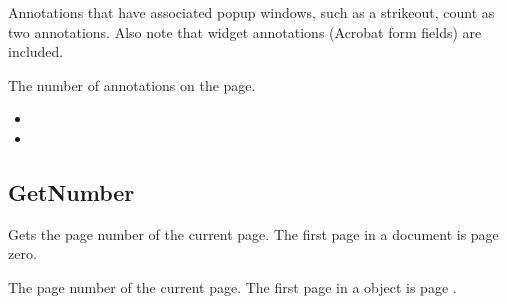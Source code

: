 \documentclass[letterpaper,12pt,english,openany,oneside]{sphinxmanual}
\begin{document}
Annotations that have associated pop\sphinxhyphen{}up windows, such as a strikeout, count as two annotations. Also note that widget annotations (Acrobat form fields) are included.


\begin{sphinxVerbatim}[commandchars=\\\{\}]
 
\end{sphinxVerbatim}


The number of annotations on the page.

\label{\detokenize{IAC_API_OLE_Objects:related-methods-123}}
\begin{itemize}
\item {} 
 

\item {} 
 

\end{itemize}




\subsection{GetNumber}
\label{\detokenize{IAC_API_OLE_Objects:getnumber}}
Gets the page number of the current page. The first page in a document is page zero.


\begin{sphinxVerbatim}[commandchars=\\\{\}]
 
\end{sphinxVerbatim}


The page number of the current page. The first page in a  object is page .
\end{document}
